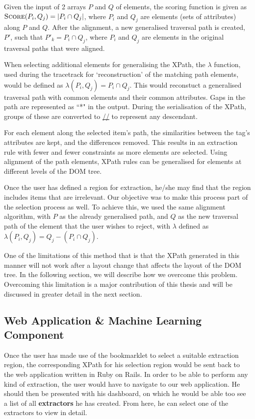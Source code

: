\documentclass[a4paper,12pt]{nurop}
\begin{document}
Given the input of 2 arrays $P$ and $Q$ of elements, the scoring function is given as
$\textsc{Score}(P_i,Q_j) = |P_i \cap Q_j|$, where $P_i$ and $Q_j$ are elements (sets of
attributes) along $P$ and $Q$. After the alignment, a new generalised traversal path is
created, $P'$, such that $P'_k = P_i \cap Q_j$, where $P_i$ and $Q_j$ are elements in the
original traversal paths that were aligned.

When selecting additional elements for generalising the XPath, the $\lambda$ function,
used during the tracetrack for `reconstruction' of the matching path elements, would be
defined as $\lambda(P_i,Q_j) = P_i \cap Q_j$. This would reconstuct a generalised traversal
path with common elements and their common attributes. Gaps in the path are represented as ``*"
 in the output. During the serialisation of the XPath, groups of these are converted to
 \url{//} to represent any descendant.
 
 For each element along the selected
item's path, the similarities between the tag's attributes are kept, and the differences
removed. This results in an extraction rule with fewer and fewer constraints as more elements
are selected. Using alignment of the path elements, XPath rules can be generalised for elements at different
levels of the DOM tree.

Once the user has defined a region for extraction, he/she may find that the region includes
items that are irrelevant. Our objective was to make this process part of the selection process as
well. To achieve this, we used the same alignment algorithm, with $P$ as the already
generalised path, and $Q$ as the new traversal path of the element that the user wishes to
reject, with $\lambda$ defined as $\lambda(P_i,Q_j) = Q_j - (P_i \cap Q_j)$.

One of the limitations of this method that is that the XPath generated
in this manner will not work after a layout change that affects the layout of the DOM
tree. In the following section, we will describe how we overcome this problem. Overcoming
this limitation is a major contribution of this thesis and will be discussed in greater
detail in the next section.

\subsection{Web Application \& Machine Learning Component}

Once the user has made use of the bookmarklet to select a suitable extraction region,
the corresponding XPath for his selection region would be sent back to the web application
written in Ruby on Rails. In order to be able to perform any kind of extraction, the user
would have to navigate to our web application. He should then be presented with his dashboard,
on which he would be able too see a list of all \textbf{extractors} he has created. From here,
he can select one of the extractors to view in detail.
\end{document}
